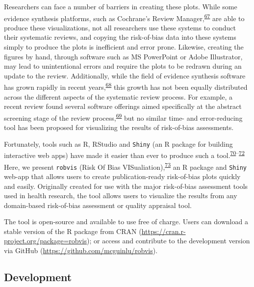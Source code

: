 \documentclass[a4paper, twoside]{templates/ociamthesis}
\begin{document}
Researchers can face a number of barriers in creating these plots. While some evidence synthesis platforms, such as Cochrane's Review Manager,\textsuperscript{\protect\hyperlink{ref-cochrane2014review}{67}} are able to produce these visualizations, not all researchers use these systems to conduct their systematic reviews, and copying the risk-of-bias data into these systems simply to produce the plots is inefficient and error prone. Likewise, creating the figures by hand, through software such as MS PowerPoint or Adobe Illustrator, may lead to unintentional errors and require the plots to be redrawn during an update to the review. Additionally, while the field of evidence synthesis software has grown rapidly in recent years,\textsuperscript{\protect\hyperlink{ref-marshall2015systematic}{68}} this growth has not been equally distributed across the different aspects of the systematic review process. For example, a recent review found several software offerings aimed specifically at the abstract screening stage of the review process,\textsuperscript{\protect\hyperlink{ref-harrison2020software}{69}} but no similar time- and error-reducing tool has been proposed for visualizing the results of risk-of-bias assessments.

Fortunately, tools such as R, RStudio and \texttt{Shiny} (an R package for building interactive web apps) have made it easier than ever to produce such a tool.\textsuperscript{\protect\hyperlink{ref-rref}{70}--\protect\hyperlink{ref-shinyref}{72}} Here, we present \texttt{robvis} (Risk Of Bias VISualiation),\textsuperscript{\protect\hyperlink{ref-mcguinness2019a}{73}} an R package and \texttt{Shiny} web-app that allows users to create publication-ready risk-of-bias plots quickly and easily. Originally created for use with the major risk-of-bias assessment tools used in health research, the tool allows users to visualize the results from any domain-based risk-of-bias assessment or quality appraisal tool.

The tool is open-source and available to use free of charge. Users can download a stable version of the R package from CRAN (\url{https://cran.r-project.org/package=robvis}); or access and contribute to the development version via GitHub (\url{https://github.com/mcguinlu/robvis}).

\hypertarget{development-1}{%
\subsection{Development}\label{development-1}}
\end{document}

